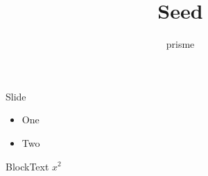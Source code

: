 \documentclass{beamer}
\begin{document}
\title{Seed}\author{prisme}
\frame{\titlepage}
\begin{frame}{Slide}\begin{itemize}\item One \pause \item Two\end{itemize}\begin{block}{Block}Text $x^2$\end{block}\end{frame}
\end{document}
